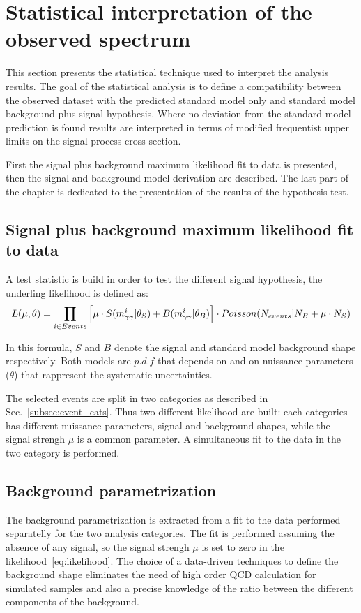 \clearpage
\section{Statistical interpretation of the observed \mgg spectrum}
\label{sec:results}

This section presents the statistical technique used to interpret the analysis results.
The goal of the statistical analysis is to define a compatibility between the observed dataset
with the predicted standard model only and standard model background plus signal hypothesis.
Where no deviation from the standard model prediction is found results are interpreted in terms
of modified frequentist upper limits on the signal process cross-section.

First the signal plus background maximum likelihood fit to data is presented, then the signal and
background model derivation are described. The last part of the chapter is dedicated to the presentation of
the results of the hypothesis test.

\subsection{Signal plus background maximum likelihood fit to data}
A test statistic is build in order to test the different signal hypothesis, the underling likelihood
is defined as:
\begin{equation}
  \label{eq:likelihood}
  L(\mu, \theta) = \prod_{i\in Events}\Big[\mu\cdot S(m_{\gamma\gamma}^{i}|\theta_S) + B(m_{\gamma\gamma}^{i}|\theta_B)\Big]
  \cdot Poisson(N_{events}|N_B+\mu\cdot N_S)
\end{equation}

In this formula, $S$ and $B$ denote the signal and standard model background shape respectively. Both
models are $p.d.f$ that depends on \mgg and on nuissance parameters ($\theta$) that rappresent the systematic uncertainties.

The selected events are split in two categories as described in Sec.~\ref{subsec:event_cats}.
Thus two different likelihood are built: each categories has different nuissance parameters, signal and background shapes,
while the signal strengh $\mu $ is a common parameter.
A simultaneous fit to the data in the two category is performed.

\clearpage

\subsection{Background parametrization}
\label{sec:background}
The background parametrization is extracted from a fit to the data performed separatelly for the two analysis
categories. The fit is performed assuming the absence of any signal, so the signal strengh $\mu$ is set
to zero in the likelihood~\ref{eq:likelihood}.
The choice of a data-driven techniques to define the background shape eliminates the need of high order
QCD calculation for simulated samples and also a precise knowledge of the ratio between the different
components of the background.


